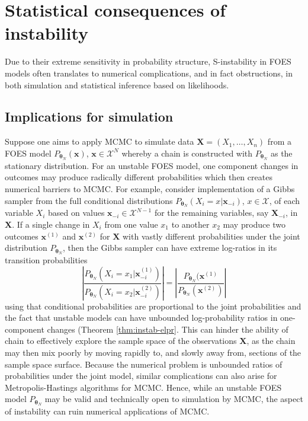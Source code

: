 \documentclass[]{article}
\theoremstyle{definition}
\begin{document}
\section{Statistical consequences of instability}\label{implications}

Due to their extreme sensitivity in probability structure, S-instability
in FOES models often translates to numerical complications, and in fact
obstructions, in both simulation and statistical inference based on
likelihoods.

\subsection{Implications for
simulation}\label{implications-for-simulation}

Suppose one aims to apply MCMC to simulate data
\(\boldsymbol X=(X_1,\ldots,X_n)\) from a FOES model
\(P_{\boldsymbol \theta_N}(\boldsymbol x)\),
\(\boldsymbol x \in\mathcal{X}^N\) whereby a chain is constructed with
\(P_{\boldsymbol \theta_N}\) as the stationary distribution. For an
unstable FOES model, one component changes in outcomes may produce
radically different probabilities which then creates numerical barriers
to MCMC. For example, consider implementation of a Gibbs sampler from
the full conditional distributions
\(P_{\boldsymbol \theta_N} (X_i = x| \boldsymbol x_{-i})\),
\(x\in\mathcal{X}\), of each variable \(X_i\) based on values
\(\boldsymbol x_{-i}\in \mathcal{X}^{N-1}\) for the remaining variables,
say \(\boldsymbol X_{-i}\), in \(\boldsymbol X\). If a single change in
\(X_i\) from one value \(x_1\) to another \(x_2\) may produce two
outcomes \(\boldsymbol x^{(1)}\) and \(\boldsymbol x^{(2)}\) for
\(\boldsymbol X\) with vastly different probabilities under the joint
distribution \(P_{\boldsymbol \theta_N}\), then the Gibbs sampler can
have extreme log-ratios in its transition probabilities \[
\left| \frac{P_{\boldsymbol \theta_N} (X_i =x_1 | \boldsymbol x^{(1)}_{-i})}{P_{\boldsymbol \theta_N} (X_i = x_2| \boldsymbol x^{(2)}_{-i}) } \right|=\left| \frac{P_{\boldsymbol \theta_N} ( \boldsymbol x^{(1)} }{P_{\boldsymbol \theta_N} (  \boldsymbol x^{(2)} ) } \right|
\] using that conditional probabilities are proportional to the joint
probabilities and the fact that unstable models can have unbounded
log-probability ratios in one-component changes (Theorem
\ref{thm:instab-elpr}. This can hinder the ability of chain to
effectively explore the sample space of the observations
\(\boldsymbol X\), as the chain may then mix poorly by moving rapidly
to, and slowly away from, sections of the sample space surface. Because
the numerical problem is unbounded ratios of probabilities under the
joint model, similar complications can also arise for
Metropolis-Hastings algorithms for MCMC. Hence, while an unstable FOES
model \(P_{\boldsymbol \theta_N}\) may be valid and technically open to
simulation by MCMC, the aspect of instability can ruin numerical
applications of MCMC.
\end{document}
